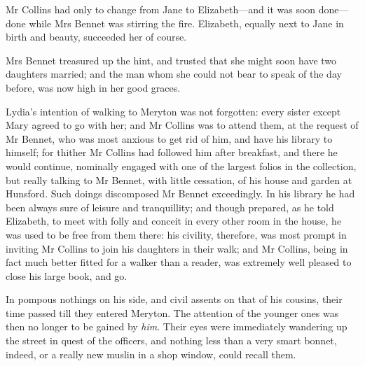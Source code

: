Mr Collins had only to change from Jane to Elizabeth—and it was soon done—done while Mrs Bennet was stirring the fire. Elizabeth, equally next to Jane in birth and beauty, succeeded her of course.

Mrs Bennet treasured up the hint, and trusted that she might soon have two daughters married; and the man whom she could not bear to speak of the day before, was now high in her good graces.

Lydia's intention of walking to Meryton was not forgotten: every sister except Mary agreed to go with her; and Mr Collins was to attend them, at the request of Mr Bennet, who was most anxious to get rid of him, and have his library to himself; for thither Mr Collins had followed him after breakfast, and there he would continue, nominally engaged with one of the largest folios in the collection, but really talking to Mr Bennet, with little cessation, of his house and garden at Hunsford. Such doings discomposed Mr Bennet exceedingly. In his library he had been always sure of leisure and tranquillity; and though prepared, as he told Elizabeth, to meet with folly and conceit in every other room in the house, he was used to be free from them there: his civility, therefore, was most prompt in inviting Mr Collins to join his daughters in their walk; and Mr Collins, being in fact much better fitted for a walker than a reader, was extremely well pleased to close his large book, and go.

In pompous nothings on his side, and civil assents on that of his cousins, their time passed till they entered Meryton. The attention of the younger ones was then no longer to be gained by \textit{him}. Their eyes were immediately wandering up the street in quest of the officers, and nothing less than a very smart bonnet, indeed, or a really new muslin in a shop window, could recall them.

